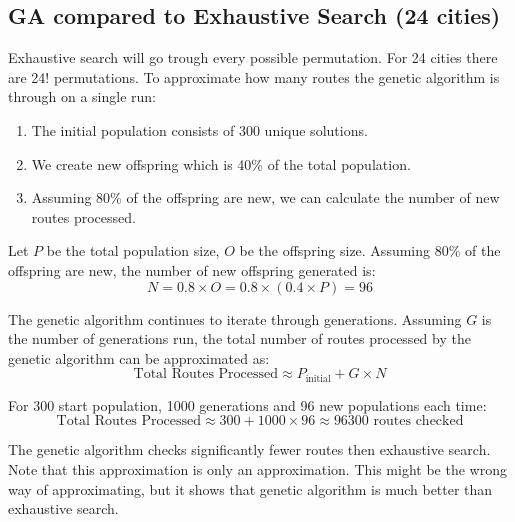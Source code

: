 \documentclass{article}
\begin{document}
    \newpage

    \subsection{GA compared to Exhaustive Search (24 cities)}

    Exhaustive search will go trough every possible permutation. For 24 cities there are 24! permutations. 
    To approximate how many routes the genetic algorithm is through on a single run:

    \begin{enumerate}
        \item The initial population consists of 300 unique solutions.
        \item We create new offspring which is 40\% of the total population.
        \item Assuming 80\% of the offspring are new, we can calculate the number of new routes processed.
    \end{enumerate}

    Let \(P\) be the total population size, \(O\) be the offspring size.
    Assuming 80\% of the offspring are new, the number of new offspring generated is:
    \[
    N = 0.8 \times O = 0.8 \times (0.4 \times P) = 96
    \]

    The genetic algorithm continues to iterate through generations. Assuming \(G\) is the number of generations run, the total number of routes processed by the genetic algorithm can be approximated as:
    \[
    \text{Total Routes Processed} \approx P_{\text{initial}} + G \times N
    \]

    For 300 start population, 1000 generations and 96 new populations each time: 
    \[
    \text{Total Routes Processed} \approx 300 + 1000 \times 96 \approx 96300 \text{ routes checked}
    \]


    The genetic algorithm checks significantly fewer routes then exhaustive search. Note that this approximation is only an approximation. This might be the wrong way of approximating, but it shows that genetic algorithm is much better than exhaustive search. 
\end{document}
